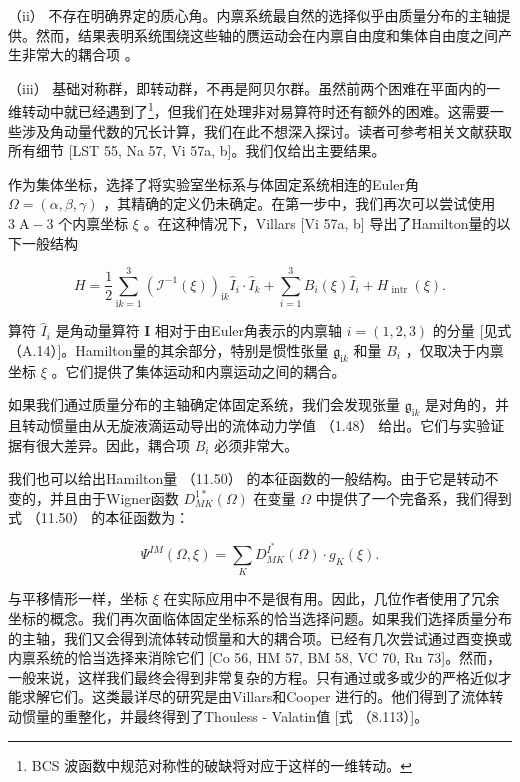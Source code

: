 （ii） 不存在明确界定的质心角。内禀系统最自然的选择似乎由质量分布的主轴提供。然而，结果表明系统围绕这些轴的赝运动会在内禀自由度和集体自由度之间产生非常大的耦合项
\cite{VC70}。

（iii） 基础对称群，即转动群，不再是阿贝尔群。虽然前两个困难在平面内的一维转动中就已经遇到了\footnote{BCS 波函数中规范对称性的破缺将对应于这样的一维转动。}，但我们在处理非对易算符时还有额外的困难。这需要一些涉及角动量代数的冗长计算，我们在此不想深入探讨。读者可参考相关文献获取所有细节
{[}LST 55, Na 57, Vi 57a, b{]}。我们仅给出主要结果。

作为集体坐标，选择了将实验室坐标系与体固定系统相连的Euler角 $\Omega=\left({\alpha,\beta,\gamma}\right)$
，其精确的定义仍未确定。在第一步中，我们再次可以尝试使用 $3\mathrm{\;A}-3$ 个内禀坐标 $\xi$ 。在这种情况下，Villars
{[}Vi 57a, b{]} 导出了Hamilton量的以下一般结构

\[
H=\frac{1}{2}\mathop{\sum}\limits^{3}_{{{\mathrm{i}k}=1}}{\left({\mathcal{I}}^{-1}\left(\xi\right)\right)}_{\mathrm{i}k}{\widehat{I}}_{i}\cdot{\widehat{I}}_{k}+\mathop{\sum}\limits^{3}_{{i=1}}{B}_{i}\left(\xi\right){\widehat{I}}_{i}+{H}_{\text{ intr }}\left(\xi\right).\tag{11.50}
\]

算符 ${\widehat{I}}_{i}$ 是角动量算符 $\boldsymbol{I}$ 相对于由Euler角表示的内禀轴
$i=\left({1,2,3}\right)$ 的分量 {[}见式 （A.14）{]}。Hamilton量的其余部分，特别是惯性张量
${\mathfrak{g}}_{\mathrm{i}k}$ 和量 ${B}_{i}$ ，仅取决于内禀坐标 $\xi$ 。它们提供了集体运动和内禀运动之间的耦合。

如果我们通过质量分布的主轴确定体固定系统，我们会发现张量 ${\mathfrak{g}}_{\mathrm{i}k}$ 是对角的，并且转动惯量由从无旋液滴运动导出的流体动力学值
（1.48） 给出。它们与实验证据有很大差异。因此，耦合项 ${B}_{i}$ 必须非常大。

我们也可以给出Hamilton量 （11.50） 的本征函数的一般结构。由于它是转动不变的，并且由于Wigner函数 ${D}^{1*}_{MK}\left(\Omega\right)$
在变量 $\Omega$ 中提供了一个完备系，我们得到式 （11.50） 的本征函数为：

\[
{\Psi}^{IM}\left({\Omega,\xi}\right)=\mathop{\sum}\limits_{K}{D}^{{I}^{*}}_{MK}\left(\Omega\right)\cdot{g}_{K}\left(\xi\right).\tag{11.51}
\]

与平移情形一样，坐标 $\xi$ 在实际应用中不是很有用。因此，几位作者使用了冗余坐标的概念。我们再次面临体固定坐标系的恰当选择问题。如果我们选择质量分布的主轴，我们又会得到流体转动惯量和大的耦合项。已经有几次尝试通过酉变换或内禀系统的恰当选择来消除它们
{[}Co 56, HM 57, BM 58, VC 70, Ru 73{]}。然而，一般来说，这样我们最终会得到非常复杂的方程。只有通过或多或少的严格近似才能求解它们。这类最详尽的研究是由Villars和Cooper
\cite{VC70} 进行的。他们得到了流体转动惯量的重整化，并最终得到了Thouless - Valatin值 {[}式 （8.113）{]}。


